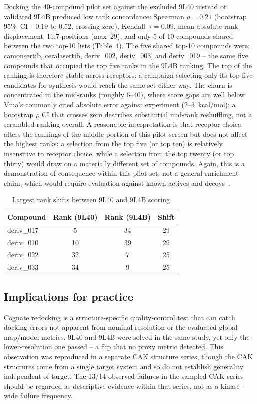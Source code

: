 \documentclass[global,twocolumn]{svjour}
\newcommand{\st}{\footnotesize\setlength{\tabcolsep}{3pt}}
\begin{document}
Docking the 40-compound pilot set against the excluded 9L40 instead of
validated 9L4B produced low rank concordance: Spearman $\rho=0.21$
(bootstrap 95\%~CI $-0.19$ to $0.52$, crossing zero), Kendall~$\tau=0.09$,
mean absolute rank displacement~11.7 positions (max~29), and only 5 of 10
compounds shared between the two top-10 lists (Table~4). The five shared
top-10 compounds were: camonsertib, ceralasertib, deriv\_002, deriv\_003,
and deriv\_019 -- the same five compounds that occupied the top five ranks
in the 9L4B ranking. The top of the ranking is therefore stable across
receptors: a campaign selecting only its top five candidates for synthesis
would reach the same set either way. The churn is concentrated in the
mid-ranks (roughly 6--40), where score gaps are well below Vina's commonly
cited absolute error against experiment (2--3~kcal/mol); a bootstrap
$\rho$ CI that crosses zero describes substantial mid-rank reshuffling,
not a scrambled ranking overall. A reasonable interpretation is that
receptor choice alters the rankings of the middle portion of this pilot
screen but does not affect the highest ranks: a selection from the top
five (or top ten) is relatively insensitive to receptor choice, while a
selection from the top twenty (or top thirty) would draw on a materially
different set of compounds. Again, this is a demonstration of consequence
within this pilot set, not a general enrichment claim, which would require
evaluation against known actives and decoys~\cite{huang2006}.

\begin{table}[t]
\centering
\caption{Largest rank shifts between 9L40 and 9L4B scoring}
\label{tab:errorprop}
\st
\begin{tabular}{lccc}
\toprule
Compound & Rank (9L40) & Rank (9L4B) & Shift \\
\midrule
deriv\_017 & 5  & 34 & 29 \\
deriv\_010 & 10 & 39 & 29 \\
deriv\_022 & 32 & 7  & 25 \\
deriv\_033 & 34 & 9  & 25 \\
\bottomrule
\end{tabular}
\end{table}
\FloatBarrier

\subsection{Implications for practice}

Cognate redocking is a structure-specific quality-control test that can
catch docking errors not apparent from nominal resolution or the evaluated
global map/model metrics. 9L40 and 9L4B were solved in the same study, yet
only the lower-resolution one passed -- a flip that no proxy metric
detected. This observation was reproduced in a separate CAK structure
series, though the CAK structures come from a single target system and so
do not establish generality independent of target. The 13/14 observed
failures in the sampled CAK series should be regarded as descriptive
evidence within that series, not as a kinase-wide failure frequency.
\end{document}
